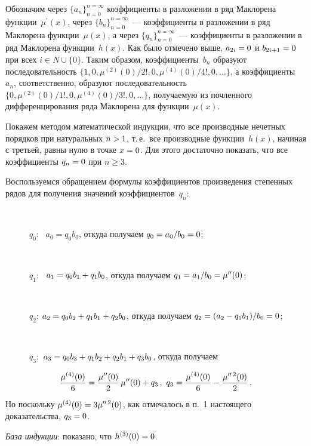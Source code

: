 \begin{multicols}{2}
{\begin{enumerate}[1.]
  Обозначим через $\{a_n\}^{n=\infty}_{n=0}$ коэффициенты в разложении в 
ряд Маклорена функции~$\mu^\prime(x)$, через $\{b_n\}^{n=\infty}_{n=0}$~--- 
коэффициенты в разложении в ряд Мак\-ло\-ре\-на функции~$\mu(x)$, а через 
$\{q_n\}^{n=\infty}_{n=0}$~--- коэффициенты в разложении в ряд Мак\-ло\-ре\-на 
функции~$h(x)$. Как было отмечено выше, $a_{2i}\hm=0$ и $b_{2i+1}\hm=0$ 
при всех $i\in N \cup \{0\}$. Таким образом, коэффициенты~$b_n$ 
образуют последовательность $\{1, 0, {\mu^{(2)}(0)}/{2!},0,
  {\mu^{(4)}(0)}/{4!}, 0, \ldots\}$, а коэффициенты~$a_n$, соответственно, 
образуют последовательность $\{0, {\mu^{(2)}(0)}/{1!}, 0, 
{\mu^{(4)}(0)}/{3!}, 0, \ldots \}$, получаемую из почленного 
дифференцирования ряда Маклорена для функции~$\mu(x)$. 
  
  Покажем методом математической индукции, что все производные нечетных 
порядков   при натуральных $n\hm>1$, т.\,е.\ все производные 
функции~$h(x)$, начиная с третьей, равны нулю в точке $x\hm=0$. Для этого 
достаточно показать, что все коэффициенты $q_n\hm=0$ при $n\geq 3$.
  
  Воспользуемся обращением формулы коэффициентов произведения 
степенных рядов для получения значений коэффициентов~$q_n$:
\begin{description}
  \item[\,]
  $q_0$: \ $a_0=q_0b_0$, откуда получаем $q_0\hm=a_0/b_0\hm=0$;
  \item[\,]  
  $q_1$: \ $a_1=q_0b_1\hm+q_1b_0$, откуда получаем 
$q_1\hm=a_1/b_0=\mu^{\prime\prime}(0)$;
    \item[\,]
  $q_2$:\: $a_2=q_0b_2\hm+q_1b_1\hm+q_2b_0$, откуда получаем $q_2\hm= 
(a_2-q_1b_1)/b_0\hm=0$;
    \item[\,]
  $q_3$:\  $a_3=q_0b_3\hm+q_1b_2\hm+q_2b_1\hm+q_3b_0$, откуда получаем
  \end{description} 
$$
  \fr{\mu^{(4)}(0)}{6}=\fr{\mu^{\prime\prime}(0)}{2}\,\mu^{\prime\prime}(0)+q
_3\,,\ q_3=\fr{\mu^{(4)}(0)}{6}-\fr{\mu^{\prime\prime\,2}(0)}{2}\,.
  $$
  Но поскольку $\mu^{(4)}(0)\hm= 3\mu^{\prime\prime\,2}(0)$, как отмечалось 
в п.~1 настоящего доказательства, $q_3\hm=0$.
  
  \textit{База индукции}: показано, что $h^{(3)}(0)\hm=0$.
  

\end{enumerate}}
\end{multicols}
